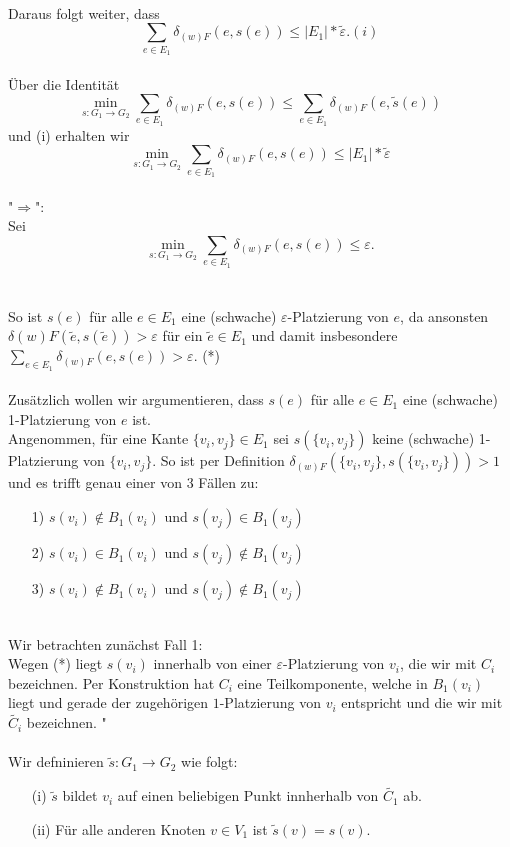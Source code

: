 \documentclass[a4paper, 12pt, twoside]{article}
\theoremstyle{Format1} %
\begin{document}
\\
Daraus folgt weiter, dass $$\sum_{e \in E_1} \delta_{(w)F}(e, s(e)) \leq |E_1| * \tilde{\varepsilon}. (i) $$
\\
Über die Identität $$\min_{s: G_1 \to G_2} \sum_{e \in E_1} \delta_{(w)F}(e, s(e)) \leq \sum_{e \in E_1} \delta_{(w)F}(e,\tilde{s}(e)) $$
und (i) erhalten wir
$$\min_{s: G_1 \to G_2} \sum_{e \in E_1} \delta_{(w)F}(e, s(e)) \leq |E_1| * \tilde{\varepsilon}$$
\\
"$\Rightarrow$":
\\
Sei $$\min_{s: G_1 \to G_2} \sum_{e \in E_1} \delta_{(w)F}(e, s(e)) \leq {\varepsilon}.$$
\\
\\
So ist $s(e)$ für alle $e \in E_1$ eine (schwache) $\varepsilon$-Platzierung von $e$,
da ansonsten $\delta{(w)F}(\tilde{e}, s(\tilde{e})) > \varepsilon$ für ein $\tilde{e} \in E_1$ und damit insbesondere $\sum_{{e}\in E_1} \delta_{(w)F}(e, s(e)) > \varepsilon$.
(*)
\\
\\
Zusätzlich wollen wir argumentieren, dass $s(e)$ für alle $e \in E_1$ eine (schwache) 1-Platzierung von $e$ ist.
\\
Angenommen, für eine Kante $\{v_i,v_j\} \in E_1$ sei $s(\{v_i, v_j\})$ keine (schwache) 1-Platzierung von $\{v_i,v_j\}$.
So ist per Definition $\delta_{(w)F}(\{v_i,v_j\}, s(\{v_i, v_j\})) > 1$ und es trifft genau einer von 3 Fällen zu:
\begin{enumerate}
	\item[1)] $s(v_i) \notin B_1(v_i)$ und $s(v_j) \in B_1(v_j)$
	\item[2)] $s(v_i) \in B_1(v_i)$ und $s(v_j) \notin B_1(v_j)$
	\item[3)] $s(v_i) \notin B_1(v_i)$ und $s(v_j) \notin B_1(v_j)$
\end{enumerate}
\\
Wir betrachten zunächst Fall 1:
\\
Wegen (*) liegt $s(v_i)$ innerhalb von  einer $\varepsilon$-Platzierung von $v_i$, die wir mit $C_i$ bezeichnen.
Per Konstruktion hat $C_i$ eine Teilkomponente, welche in $B_1(v_i)$ liegt und gerade der zugehörigen $1$-Platzierung von $v_i$ entspricht und die wir mit $\tilde{C_i}$ bezeichnen.
"\\
\\
Wir defninieren $\tilde{s}: G_1 \rightarrow G_2$ wie folgt:
\begin{enumerate}
	\item[(i)] $\tilde{s}$ bildet $v_i$ auf einen beliebigen Punkt innherhalb von $\tilde{C_1}$ ab.
	\item[(ii)] Für alle anderen Knoten $v \in V_1$ ist $\tilde{s}(v)=s(v)$.
\end{enumerate}
\end{document}
